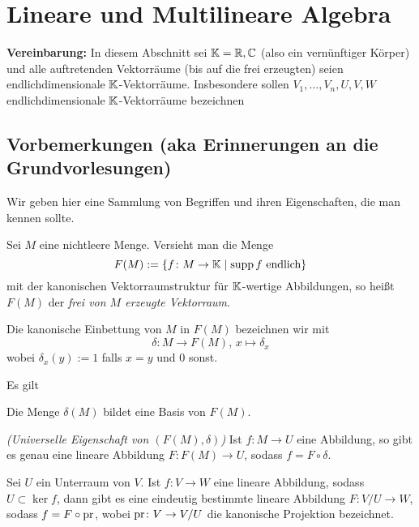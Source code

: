 
\section{Lineare und Multilineare Algebra}
\label{sec:mla}

\textbf{Vereinbarung:} In diesem Abschnitt sei $\mathbb{K}=\mathbb{R},\mathbb{C}$ (also ein
vernünftiger Körper) und alle
auftretenden Vektorräume (bis auf die frei erzeugten) seien
endlichdimensionale $\mathbb{K}$-Vektorräume. Insbesondere sollen
$V_1,\dots,V_n, U,V,W$ endlichdimensionale $\mathbb{K}$-Vektorräume bezeichnen

\subsection{Vorbemerkungen (aka Erinnerungen an die Grundvorlesungen)}
\label{sec:vbakaegv}

Wir geben hier eine Sammlung von Begriffen und ihren Eigenschaften,
die man kennen sollte.

\begin{definition}
  Sei $M$ eine nichtleere Menge. Versieht man die Menge
  \begin{equation*}
    F(M) := \left\lbrace f \colon M \to \mathbb{K} \mid \operatorname{supp} f\text{ endlich} \right\rbrace
  \end{equation*}
  mit der kanonischen Vektorraumstruktur für $\mathbb{K}$-wertige Abbildungen,
  so heißt $F(M)$ der \emph{frei von $M$ erzeugte Vektorraum}.

  Die kanonische Einbettung von $M$ in $F(M)$ bezeichnen wir mit
  \begin{equation*}
    \delta \colon M \to F(M),\, x \mapsto \delta_x
  \end{equation*}
  wobei $\delta_x(y) := 1$ falls $x=y$ und $0$ sonst.
\end{definition}

\begin{proposition}
  Es gilt
  \begin{statements}
  \item Die Menge $\delta(M)$ bildet eine Basis von $F(M)$.
  \item \textit{(Universelle Eigenschaft von $(F(M),\delta)$)} Ist
    $f\colon M \to U$ eine Abbildung, so gibt es genau eine lineare
    Abbildung $F\colon F(M) \to U$, sodass $f = F\circ\delta$.
  \end{statements}
\end{proposition}

\begin{proposition}
  Sei $U$ ein Unterraum von $V$. Ist $f\colon
  V \to W$ eine lineare Abbildung, sodass $U \subset \ker f$, dann
  gibt es eine eindeutig bestimmte lineare Abbildung $F\colon V/U \to
  W$, sodass $f = F\circ \operatorname{pr}$, wobei $\operatorname{pr}\colon V \to V/U$ die
  kanonische Projektion bezeichnet.
\end{proposition}

